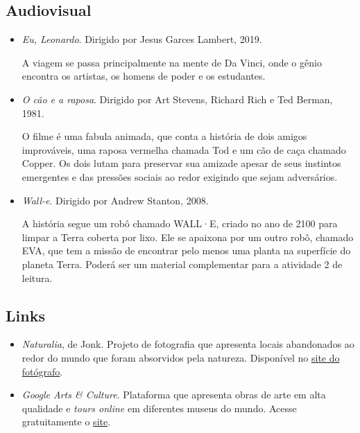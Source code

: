 \documentclass[11pt]{extarticle}
\begin{document}
\subsection{Audiovisual}

\begin{itemize}

\item \textit{Eu, Leonardo}. Dirigido por Jesus Garces Lambert, 2019.

A viagem se passa principalmente na mente de Da Vinci, onde o gênio encontra os artistas, os homens de poder e os estudantes.

\item \textit{O cão e a raposa}. Dirigido por Art Stevens, Richard Rich e Ted Berman, 1981.

O filme é uma fabula animada, que conta a história de dois amigos improváveis, uma raposa vermelha chamada Tod e um cão de caça chamado Copper. Os dois lutam para preservar sua amizade apesar de seus instintos emergentes e das pressões sociais ao redor exigindo que sejam adversários. 

\item \textit{Wall-e}. Dirigido por Andrew Stanton, 2008.

A história segue um robô chamado WALL·E, criado no ano de 2100 para limpar a Terra coberta por lixo. Ele se apaixona por um outro robô, chamado EVA, que tem a missão de encontrar pelo menos uma planta na superfície do planeta Terra. Poderá ser um material complementar para a atividade 2 de leitura.

\end{itemize}

\subsection{Links}

\begin{itemize}

\item \textit{Naturalia}, de Jonk. Projeto de fotografia que apresenta locais abandonados ao redor do mundo que foram absorvidos pela natureza. Disponível no \href{https://www.jonk-photography.com/en/naturalia/}{site do fotógrafo}. 

\item \textit{Google Arts \& Culture}. Plataforma que apresenta obras de arte em alta qualidade e \textit{tours online} em diferentes museus do mundo. Acesse gratuitamente o \href{https://artsandculture.google.com/}{site}. 

\end{itemize}
\end{document}
